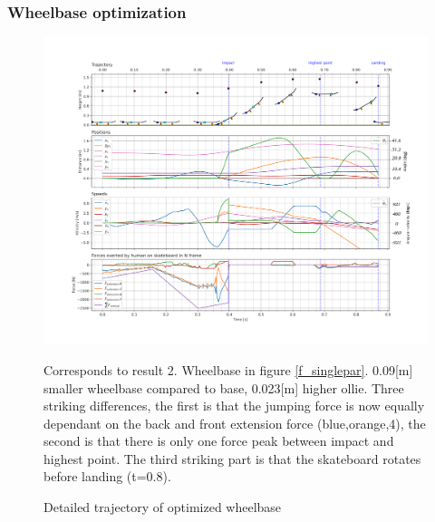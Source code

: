 \documentclass[default,iicol]{sn-jnl}
\begin{document}
\subsubsection{Wheelbase optimization}
\begin{figure}
    \centering
    \includegraphics[trim={0cm 0cm 0cm 0cm},clip,width=\textwidth]{figure/Results/data_l_wbdpi600.png}    \vspace{-1cm}\caption[Trajectory, positions, speeds, and forces for wheelbase optimization]{Detailed trajectory of optimized wheelbase}\label{f_wheelbase}
    Corresponds to result 2. Wheelbase in figure \ref{f_singlepar}. 0.09[m] smaller wheelbase compared to base, 0.023[m] higher ollie. Three striking differences, the first is that the jumping force is now equally dependant on the back and front extension force (blue,orange,4), the second is that there is only one force peak between impact and highest point. The third striking part is that the skateboard rotates before landing (t=0.8).
\end{figure}
\end{document}
